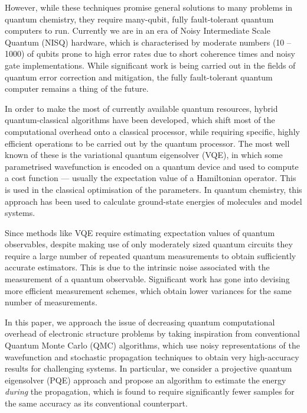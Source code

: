 \documentclass[%
 reprint,
 amsmath,amssymb,
 aps,
]{revtex4-2}
\begin{document}
However, while these techniques promise general solutions to many problems in quantum chemistry, they require many-qubit, fully fault-tolerant quantum computers to run. Currently we are in an era of Noisy Intermediate Scale Quantum (NISQ) hardware,\cite{Preskill2018} which is characterised by moderate numbers (10 -- 1000) of qubits prone to high error rates due to short coherence times and noisy gate implementations.\cite{Linke2017} While significant work is being carried out in the fields of quantum error correction\cite{Knill1197,Knill2000,Kribs2005,Terhal2015,Georgescu2020} and mitigation, \cite{Endo2021,Cai2022,Suzuki2022,Bultrini2023} the fully fault-tolerant quantum computer remains a thing of the future.

In order to make the most of currently available quantum resources, hybrid quantum-classical algorithms\cite{Farhi2014, Peruzzo2014, Colless2018, Higgott2019, Nakanishi2019, Greene-Diniz2021, Smart2021} have been developed, which shift most of the computational overhead onto a classical processor, while requiring specific, highly efficient operations to be carried out by the quantum processor. The most well known of these is the variational quantum eigensolver (VQE),\cite{Peruzzo2014} in which some parametrised wavefunction is encoded on a quantum device and used to compute a cost function --- usually the expectation value of a Hamiltonian operator. This is used in the classical optimisation of the parameters. In quantum chemistry, this approach has been used to calculate ground-state energies of molecules and model systems.\cite{Peruzzo2014, Shen2017, Hempel2018} 

{ Since methods like VQE require estimating expectation values of quantum observables, despite making use of only moderately sized quantum circuits they require a large number of repeated quantum measurements to obtain sufficiently accurate estimators. This is due to the intrinsic noise associated with the measurement of a quantum observable. Significant work has gone into devising more efficient measurement schemes,\cite{Hadfield2021,Choi2022, Choi2023, Yen2023} which obtain lower variances for the same number of measurements.}

In this paper, we approach the issue of decreasing quantum computational overhead of electronic structure problems by taking inspiration from conventional Quantum Monte Carlo (QMC) algorithms,\cite{Booth2009, Thom2010, Filip2020} which use noisy representations of the wavefunction and stochastic propagation techniques to obtain very high-accuracy results for challenging systems.  In particular, we consider a projective quantum eigensolver (PQE)\cite{Stair2021} approach and propose an algorithm to estimate the energy \textit{during} the propagation, which is found to require significantly fewer samples for the same accuracy as its conventional counterpart. 
\end{document}
